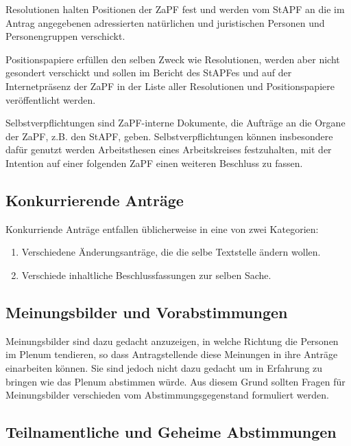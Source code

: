 \documentclass[
  a4paper,
  oneside]{scrartcl}
\providecommand{\tightlist}{%
  \setlength{\itemsep}{0pt}\setlength{\parskip}{0pt}}
\begin{document}
Resolutionen halten Positionen der ZaPF fest und werden vom StAPF an die
im Antrag angegebenen adressierten natürlichen und juristischen Personen
und Personengruppen verschickt.

Positionspapiere erfüllen den selben Zweck wie Resolutionen, werden aber
nicht gesondert verschickt und sollen im Bericht des StAPFes und auf der
Internetpräsenz der ZaPF in der Liste aller Resolutionen und
Positionspapiere veröffentlicht werden.

Selbstverpflichtungen sind ZaPF-interne Dokumente, die Aufträge an die
Organe der ZaPF, z.B. den StAPF, geben. Selbstverpflichtungen können
insbesondere dafür genutzt werden Arbeitsthesen eines Arbeitskreises
festzuhalten, mit der Intention auf einer folgenden ZaPF einen weiteren
Beschluss zu fassen.

\subsection*{Konkurrierende Anträge}\label{konkurrierende-antruxe4ge}

Konkurriende Anträge entfallen üblicherweise in eine von zwei
Kategorien:

\begin{enumerate}
\def\labelenumi{\arabic{enumi}.}
\tightlist
\item
  Verschiedene Änderungsanträge, die die selbe Textstelle ändern wollen.
\item
  Verschiede inhaltliche Beschlussfassungen zur selben Sache.
\end{enumerate}

\subsection*{Meinungsbilder und
Vorabstimmungen}\label{meinungsbilder-und-vorabstimmungen}

Meinungsbilder sind dazu gedacht anzuzeigen, in welche Richtung die
Personen im Plenum tendieren, so dass Antragstellende diese Meinungen in
ihre Anträge einarbeiten können. Sie sind jedoch nicht dazu gedacht um
in Erfahrung zu bringen wie das Plenum abstimmen würde. Aus diesem Grund
sollten Fragen für Meinungsbilder verschieden vom Abstimmungsgegenstand
formuliert werden.

\subsection*{Teilnamentliche und Geheime
Abstimmungen}\label{teilnamentliche-und-geheime-abstimmungen}
\end{document}

